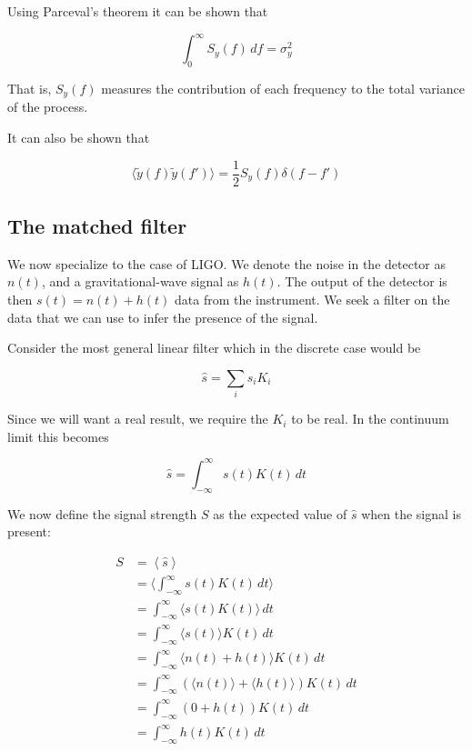 Using Parceval's theorem it can be shown that

\begin{equation*}
\int_0^\infty S_y(f)\, df = \sigma^2_y
\end{equation*}

That is, $S_y(f)$ measures the contribution of each frequency 
to the total variance of the process.

It can also be shown that 

\begin{equation}
\label{eq:psd2}
\langle \tilde{y}(f) \tilde{y}(f')\rangle = \frac{1}{2} S_y(f)
\delta(f-f')
\end{equation}

\subsection{The matched filter}
\label{ssec:matched_filter}

We now specialize to the case of LIGO.  We denote the noise in the
detector as $n(t)$, and a gravitational-wave signal as $h(t)$.  The
output of the detector is then $s(t)=n(t)+h(t)$ data from the
instrument.  We seek a filter on the data that we can use to infer the
presence of the signal.

Consider the most general linear filter which  in the discrete case
would be

\begin{equation}
\hat{s} = \sum_i s_i K_i
\end{equation}

Since we will want a real result, we require the $K_i$ to be real.  In
the continuum limit this becomes

\begin{equation}
\hat{s} = \int_{-\infty}^\infty s(t) K(t)\, dt
\end{equation}

We now define the signal strength $S$ as the expected value of
$\hat{s}$ when the signal is present:

\begin{align*}
S &= \left\langle \hat{s} \right\rangle \\
&= \langle  \int_{-\infty}^\infty s(t) K(t)\, dt \rangle \\
&= \int_{-\infty}^\infty \langle s(t) K(t)\rangle \, dt \\
&= \int_{-\infty}^\infty \langle s(t) \rangle K(t) \, dt \\
&= \int_{-\infty}^\infty \langle n(t) + h(t) \rangle K(t) \, dt \\
&= \int_{-\infty}^\infty \left( \langle n(t) \rangle + \langle h(t)
\rangle \right)  K(t) \, dt \\
&= \int_{-\infty}^\infty \left( 0 + h(t) \right)  K(t) \, dt \\
&= \int_{-\infty}^\infty h(t) K(t) \, dt \\
\end{align*}

